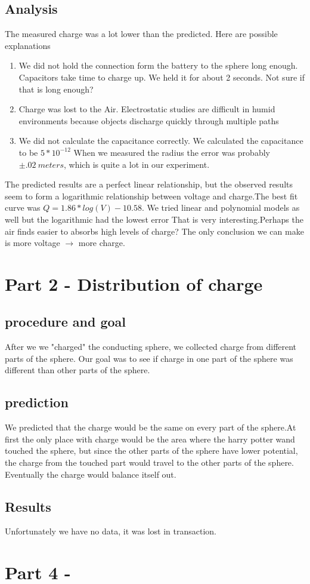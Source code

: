 \documentclass[12pt]{article}
\begin{document}
\subsection*{Analysis}
The measured charge was a lot lower than the predicted. Here are possible explanations
\begin{enumerate}
	\item 
	We did not hold the connection form the battery to the sphere long enough. Capacitors take time to charge up. We held it for about 2 seconds. Not sure if that is long enough?
	\item Charge was lost to the Air. Electrostatic studies are difficult in humid environments because objects discharge quickly through multiple paths 
	\item We did not calculate the capacitance correctly. We calculated the capacitance to be $5 * 10^{-12}$ When we measured the radius the error was probably $\pm .02 \ meters$, which is quite a lot in our experiment.
\end{enumerate}
The predicted results are a perfect linear relationship, but the observed results seem to form a logarithmic relationship between voltage and charge.The best fit curve was $Q=1.86*log(V)-10.58$. We tried linear and polynomial models as well but the logarithmic had the lowest error That is very interesting.Perhaps the air finds easier to absorbs high levels of charge? The only conclusion we can make is more voltage $\rightarrow$ more charge.

\section*{Part 2 - Distribution of charge}
\subsection*{procedure and goal}
After we we "charged" the conducting sphere, we collected charge from different parts of the sphere. Our goal was to see if charge in one part of the sphere was different than other parts of the sphere.
\subsection*{prediction}
We predicted that the charge would be the same on every part of the sphere.At first the only place with charge would be the area where the harry potter wand touched the sphere, but since the other parts of the sphere have lower potential, the charge from the touched part would travel to the other parts of the sphere. Eventually the charge would balance itself out. 
\subsection*{Results} 
Unfortunately we have no data, it was lost in transaction.   

\section*{Part 4 - }
\end{document}

